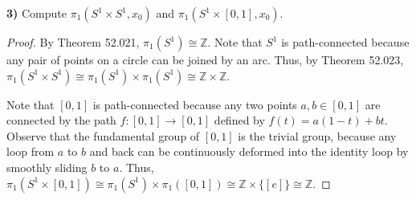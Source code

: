 \documentclass[12pt]{report}
\begin{document}
\newpage\noindent\textbf{3)} Compute $\pi_1(S^1 \times S^1, x_0)$ and $\pi_1(S^1 \times [0,1],x_0)$.
\begin{proof}
    By Theorem 52.021, $\pi_1(S^1) \cong \mathbb Z$.
    Note that $S^1$ is path-connected because any pair of points on a circle can be joined by an arc.
    Thus, by Theorem 52.023, $\pi_1(S^1 \times S^1) \cong \pi_1(S^1) \times \pi_1(S^1) \cong \mathbb Z \times \mathbb Z$.

    Note that $[0,1]$ is path-connected because any two points $a,b \in [0,1]$ are connected by the path $f: [0,1] \to [0,1]$ defined by $f(t) = a(1-t)+bt$.
    Observe that the fundamental group of $[0,1]$ is the trivial group, because any loop from $a$ to $b$ and back can be continuously deformed into the identity loop by smoothly sliding $b$ to $a$.
    Thus, $\pi_1(S^1 \times [0,1]) \cong \pi_1(S^1) \times \pi_1([0,1]) \cong \mathbb Z \times \{[e]\} \cong \mathbb Z$.
\end{proof}
\end{document}

